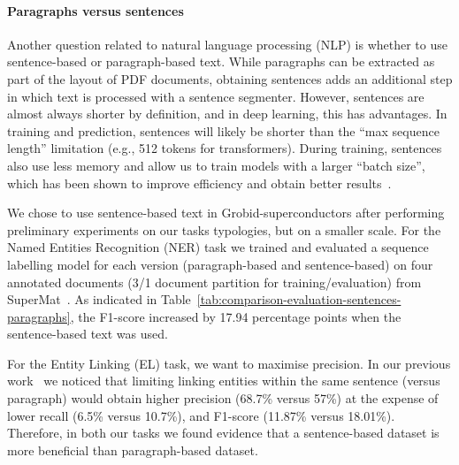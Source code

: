 \documentclass[]{interact}
\theoremstyle{plain}%
\theoremstyle{definition}
\theoremstyle{remark}
\begin{document}
\paragraph*{Paragraphs versus sentences}
Another question related to natural language processing (NLP) is whether to use sentence-based or paragraph-based text.
While paragraphs can be extracted as part of the layout of PDF documents, obtaining sentences adds an additional step in which text is processed with a sentence segmenter.
However, sentences are almost always shorter by definition, and in deep learning, this has advantages.
In training and prediction, sentences will likely be shorter than the ``max sequence length'' limitation (e.g., 512 tokens for transformers).
During training, sentences also use less memory and allow us to train models with a larger ``batch size'', which has been shown to improve efficiency and obtain better results~\cite{roberta}. 

We chose to use sentence-based text in Grobid-superconductors after performing preliminary experiments on our tasks typologies, but on a smaller scale. 
For the Named Entities Recognition (NER) task we trained and evaluated a sequence labelling model for each version (paragraph-based and sentence-based) on four annotated documents (3/1 document partition for training/evaluation) from SuperMat~\cite{foppiano2021supermat}.
As indicated in Table~\ref{tab:comparison-evaluation-sentences-paragraphs}, the F1-score increased by 17.94 percentage points when the sentence-based text was used.

For the Entity Linking (EL) task, we want to maximise precision. 
In our previous work~\cite{foppiano2019proposal} we noticed that limiting linking entities within the same sentence (versus paragraph) would obtain higher precision (68.7\% versus 57\%) at the expense of lower recall (6.5\% versus 10.7\%), and F1-score (11.87\% versus 18.01\%).
Therefore, in both our tasks we found evidence that a sentence-based dataset is more beneficial than paragraph-based dataset.
\end{document}
